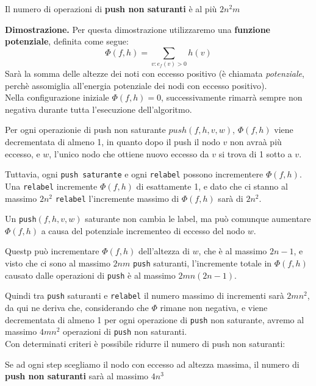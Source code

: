 \begin{myblockquote}
    Il numero di operazioni di \textbf{push non saturanti} è al più $2n^2m$
\end{myblockquote}

\textbf{Dimostrazione.} Per questa dimostrazione utilizzaremo una \textbf{funzione potenziale}, definita come segue:
$$
    \Phi(f, h) = \sum_{v:e_f(v)>0}h(v)
$$
Sarà la somma delle altezze dei noti con eccesso positivo (è chiamata \textit{potenziale}, perchè assomiglia all'energia potenziale dei nodi con eccesso positivo).\\

Nella configurazione iniziale $\Phi(f, h) = 0$, successivamente rimarrà sempre non negativa durante tutta l'esecuzione dell'algoritmo.

Per ogni operazionie di push non saturante $push(f, h, v, w)$, $\Phi(f, h)$ viene decrementata di almeno 1, in quanto dopo il push il nodo $v$ non avraà più eccesso, e $w$, l'unico nodo che ottiene nuovo eccesso da $v$ si trova di 1 sotto a $v$.

Tuttavia, ogni \texttt{push saturante} e ogni \texttt{relabel} possono incrementere $\Phi(f, h)$. Una \texttt{relabel} incremente $\Phi(f, h)$ di esattamente 1, e dato che ci stanno al massimo $2n^2$ \texttt{relabel} l'incremente massimo di $\Phi(f, h)$ sarà di $2n^2$.

Un \texttt{push}$(f, h, v, w)$ saturante non cambia le label, ma può comunque aumentare $\Phi(f, h)$ a causa del potenziale incrementeo di eccesso del nodo $w$.

Questp può incrementare $\Phi(f, h)$ dell'altezza di $w$, che è al massimo $2n-1$, e visto che ci sono al massimo $2nm$ \texttt{push} saturanti, l'incremente totale  in $\Phi(f, h)$
causato dalle operazioni di \texttt{push} è al massimo $2mn(2n-1)$.

Quindi tra \texttt{push} saturanti e \texttt{relabel} il numero massimo di incrementi sarà $2mn^2$, da qui ne deriva che, considerando che $\Phi$ rimane non negativa, e viene decrementata di almeno 1 per ogni operazione di \texttt{push} non saturante, avremo al massimo $4mn^2$ operazioni di \texttt{push} non saturanti.\\

Con determinati criteri è possibile ridurre il numero di push non saturanti:

\begin{myblockquote}
    Se ad ogni step scegliamo il nodo con eccesso ad altezza massima, il numero di \textbf{push non saturanti} sarà al massimo $4n^3$
\end{myblockquote}